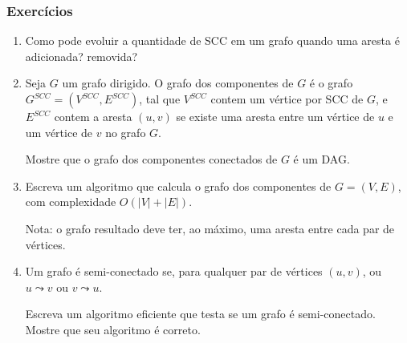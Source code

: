 \documentclass{beamer}
\begin{document}

\begin{frame}
\frametitle{Exercícios}

\begin{enumerate}
\item Como pode evoluir a quantidade de SCC em um grafo quando uma
  aresta é adicionada? removida?
\item Seja $G$ um grafo dirigido. O grafo dos componentes de $G$ é o grafo
  $G^{SCC} = (V^{SCC}, E^{SCC})$, tal que $V^{SCC}$ contem um vértice por
  SCC de $G$, e $E^{SCC}$ contem a aresta $(u, v)$ se existe uma aresta entre
  um vértice de $u$ e um vértice de $v$ no grafo $G$.

  Mostre que o grafo dos componentes conectados de $G$ é um DAG.
\item Escreva um algoritmo que calcula o grafo dos componentes de
  $G=(V, E)$, com complexidade $O(|V|+|E|)$. 

  Nota: o grafo resultado deve ter, ao máximo, uma aresta entre cada
  par de vértices.

\item Um grafo é semi-conectado se, para qualquer par de vértices $(u, v)$,
  ou $u \leadsto v$ ou $v \leadsto u$.

  Escreva um algoritmo eficiente que testa se um grafo é semi-conectado.
  Mostre que seu algoritmo é correto.
\end{enumerate}

\end{frame}
\end{document}
